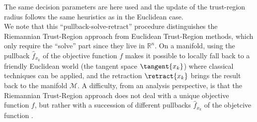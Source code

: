The same decision parameters are here used and the update of the trust-region radius follows the same heuristics as in the Euclidean case. \\ 
We note that this “pullback-solve-retract” procedure distinguishes the Riemannian Trust-Region approach from Euclidean Trust-Region methods, which only require the “solve” part since they live in $\mathbb{R}^n$. On a manifold, using the pullback $\hat{f}_{x_k}$ of the objective function $f$ makes it possible to locally fall back to a friendly Euclidean world (the tangent space $\tangent{x_k}$) where classical techniques can be applied, and the retraction $\retract{x_k}$ brings the result back to the manifold $\mathcal{M}$. A difficulty, from an analysis perspective, is that the Riemannian Trust-Region approach does not deal with a unique objective function $f$,
but rather with a succession of different pullbacks $\hat{f}_{x_k}$ of the objetcive function \cite[p.~305]{AbsilBakerGallivan:2007}. \\

